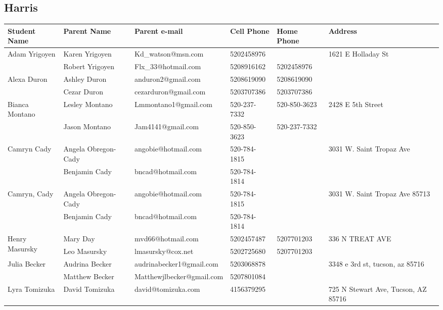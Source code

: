\documentclass[landscape]{article}\usepackage[]{graphicx}\usepackage[]{color}
\begin{document}
\subsection{Harris}
\begin{longtable}{|p{100pt}|p{100pt}|p{140pt}|p{60pt}|p{64pt}|p{120pt}|}
\textbf{Student Name} & \textbf{Parent Name} & \textbf{Parent e-mail} & \textbf{Cell Phone} & \textbf{Home Phone} & \textbf{Address}\\
\hline
\hline
\multirow{2}{100pt}{Adam Yrigoyen} & Karen Yrigoyen  & Kd\_watson@msn.com & 5202458976 &  & \multirow{2}{120pt}{1621 E Holladay St} \\
 & Robert Yrigoyen & Flx\_33@hotmail.com  & 5208916162 & 5202458976 & \\
\hline
\multirow{2}{100pt}{Alexa Duron} & Ashley Duron & anduron2@gmail.com & 5208619090 & 5208619090 & \multirow{2}{120pt}{} \\
 & Cezar Duron & cezarduron@gmail.com & 5203707386 & 5203707386 & \\
\hline
\multirow{2}{100pt}{Bianca Montano} & Lesley Montano & Lmmontano1@gmail.com & 520-237-7332 & 520-850-3623 & \multirow{2}{120pt}{2428 E 5th Street} \\
 & Jason Montano & Jam4141@gmail.com & 520-850-3623 & 520-237-7332 & \\
\hline
\multirow{2}{100pt}{Camryn Cady} & Angela Obregon-Cady & angobie@hotmail.com & 520-784-1815 &  & \multirow{2}{120pt}{3031 W. Saint Tropaz Ave} \\
 & Benjamin Cady & bncad@hotmail.com & 520-784-1814 &  & \\
\hline
\multirow{2}{100pt}{Camryn, Cady} & Angela Obregon-Cady & angobie@hotmail.com & 520-784-1815 &  & \multirow{2}{120pt}{3031 W. Saint Tropaz Ave 85713} \\
 & Benjamin Cady & bncad@hotmail.com & 520-784-1814 &  & \\
\hline
\multirow{2}{100pt}{Henry Masursky} & Mary Day & mvd66@hotmail.com & 5202457487 & 5207701203 & \multirow{2}{120pt}{336 N TREAT AVE} \\
 & Leo Masursky & lmasursky@cox.net & 5202725680 & 5207701203 & \\
\hline
\multirow{2}{100pt}{Julia Becker} & Audrina Becker & audrinabecker1@gmail.com & 5203068878 &  & \multirow{2}{120pt}{3348 e 3rd st, tucson, az 85716} \\
 & Matthew Becker & Matthewjlbecker@gmail.com & 5207801084 &  & \\
\hline
\multirow{2}{100pt}{Lyra Tomizuka} & David Tomizuka & david@tomizuka.com & 4156379295 &  & \multirow{2}{120pt}{725 N Stewart Ave, Tucson, AZ 85716} \\

\end{longtable}
\end{document}
